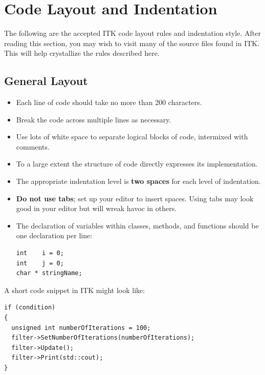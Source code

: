 \section{Code Layout and Indentation}%
\label{sec:CodeLayoutAndIndentation}

The following are the accepted ITK code layout rules and indentation style.
After reading this section, you may wish to visit many of the source files found
in ITK. This will help crystallize the rules described here.


\subsection{General Layout}%
\label{subsec:GeneralLayout}

\begin{itemize}
\item Each line of code should take no more than 200 characters.
\item Break the code across multiple lines as necessary.
\item Use lots of white space to separate logical blocks of code, intermixed
with comments.
\item To a large extent the structure of code directly expresses its
implementation.
\item The appropriate indentation level is \textbf{two spaces} for each level of
indentation.
\item \textbf{Do not use tabs}; set up your editor to insert spaces. Using tabs
may look good in your editor but will wreak havoc in others.
\item The declaration of variables within classes, methods, and functions should
be one declaration per line:

\small
\begin{verbatim}
int    i = 0;
int    j = 0;
char * stringName;
\end{verbatim}
\normalsize
\end{itemize}

A short code snippet in ITK might look like:

\small
\begin{verbatim}
if (condition)
{
  unsigned int numberOfIterations = 100;
  filter->SetNumberOfIterations(numberOfIterations);
  filter->Update();
  filter->Print(std::cout);
}
\end{verbatim}
\normalsize

